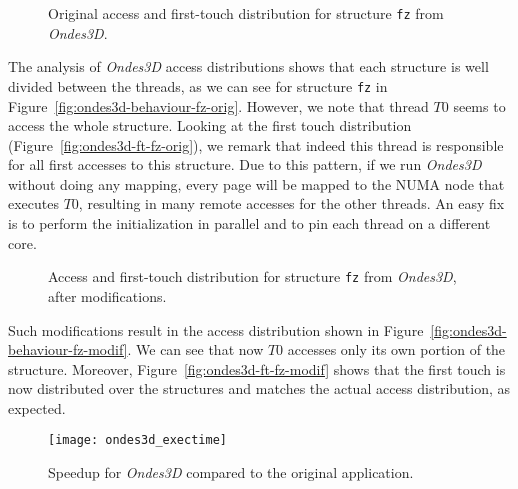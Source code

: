 \begin{figure}[htb]
    \centering

    \caption{Original access and first-touch distribution for structure
        \texttt{fz} from \emph{Ondes3D}.}
    \label{fig:ondes3d-orig}
\end{figure}

The analysis of \emph{Ondes3D} access distributions shows that each
structure is well divided between the threads, as we can see for structure \texttt{fz} in Figure~\ref{fig:ondes3d-behaviour-fz-orig}.
However, we note that thread $T0$ seems to access the whole structure. Looking at the first touch distribution (Figure~\ref{fig:ondes3d-ft-fz-orig}), we
remark that indeed this thread is responsible for all first accesses to this structure. Due to
this pattern, if we run \emph{Ondes3D} without doing any mapping, every page
will be mapped to the NUMA node that executes $T0$, resulting in many remote accesses for the other threads. An easy fix is to
perform the initialization in parallel and to pin each thread on a different core.

\begin{figure}[htb]
    \centering

    \caption{Access and first-touch distribution  for structure
        \texttt{fz} from \emph{Ondes3D}, after modifications.}
    \label{fig:ondes3d-modif}
\end{figure}

Such modifications result in the access distribution shown in Figure~\ref{fig:ondes3d-behaviour-fz-modif}. We can see that now $T0$ accesses only
its own portion of the structure. Moreover, Figure~\ref{fig:ondes3d-ft-fz-modif} shows that the first touch is now distributed
over the structures and matches the actual access distribution, as expected.

\begin{figure}[htpb]
    \centering
    \texttt{[image: ondes3d\_exectime]}
    \caption{Speedup for \emph{Ondes3D} compared to the original application.}
\label{fig:ondes-res}
\end{figure}

